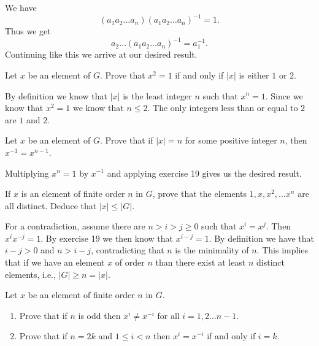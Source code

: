 \begin{solution}
\begin{solution}
\begin{solution}
  We have
  \[(a_1 a_2 \ldots a_n) (a_1 a_2 \ldots a_n)^{-1} = 1.\]
  Thus we get
  \[a_2 \ldots (a_1 a_2 \ldots a_n)^{-1} = a_1^{-1}.\]
  Continuing like this we arrive at our desired result.
\end{solution}

\begin{problem}
  Let $x$ be an element of $G$.
  Prove that $x^2 = 1$ if and only if $|x|$ is either $1$ or $2$.
\end{problem}

\begin{solution}
  By definition we know that $|x|$ is the least integer $n$ such that $x^n = 1$.
  Since we know that $x^2 = 1$ we know that $n \le 2$.
  The only integers less than or equal to $2$ are $1$ and $2$.
\end{solution}

\begin{problem}
  Let $x$ be an element of $G$.
  Prove that if $|x| = n$ for some positive integer $n$, then $x^{-1} = x^{n-1}$.
\end{problem}

\begin{solution}
  Multiplying $x^n = 1$ by $x^{-1}$ and applying exercise 19 gives us the desired result.
\end{solution}

\setcounter{problem}{31}
\begin{problem}
  If $x$ is an element of finite order $n$ in $G$, prove that the elements $1, x, x^2, \ldots x^n$ are all distinct.
  Deduce that $|x| \le |G|$.
\end{problem}

\begin{solution}
  For a contradiction, assume there are $n > i > j \ge 0$ such that $x^i = x^j$.
  Then $x^i x^{-j} = 1$.
  By exercise 19 we then know that $x^{i - j} = 1$.
  By definition we have that $i - j > 0$ and $n > i - j$, contradicting that $n$ is the minimality of $n$.
  This implies that if we have an element $x$ of order $n$ than there exist at least $n$ distinct elements, i.e., $|G| \ge n = |x|$.
\end{solution}

\begin{problem}
  Let $x$ be an element of finite order $n$ in $G$.
  \begin{enumerate}[label=(\alph*)]
    \item Prove that if $n$ is odd then $x^i \neq x^{-i}$ for all $i = 1, 2 \ldots n - 1$.
    \item Prove that if $n = 2k$ and $1 \le i < n$ then $x^i = x^{-i}$ if and only if $i = k$.
  \end{enumerate}
\end{problem}


\end{solution}
\end{solution}
